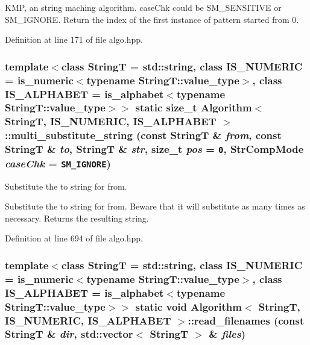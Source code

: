 KMP, an string maching algorithm. caseChk could be SM\_\-SENSITIVE or SM\_\-IGNORE. Return the index of the first instance of pattern started from 0. 

Definition at line 171 of file algo.hpp.\hypertarget{classAlgorithm_0a6aaf09e6d9d4214b5d6c86938006fb}{
\subsubsection[{multi\_\-substitute\_\-string}]{\setlength{\rightskip}{0pt plus 5cm}template$<$class StringT  = std::string, class IS\_\-NUMERIC  = is\_\-numeric$<$typename StringT::value\_\-type$>$, class IS\_\-ALPHABET  = is\_\-alphabet$<$typename StringT::value\_\-type$>$$>$ static size\_\-t {\bf Algorithm}$<$ StringT, IS\_\-NUMERIC, IS\_\-ALPHABET $>$::multi\_\-substitute\_\-string (const StringT \& {\em from}, \/  const StringT \& {\em to}, \/  StringT \& {\em str}, \/  size\_\-t {\em pos} = {\tt 0}, \/  StrCompMode {\em caseChk} = {\tt SM\_\-IGNORE})}}
\label{classAlgorithm_0a6aaf09e6d9d4214b5d6c86938006fb}


Substitute the to string for from. 

Substitute the to string for from. Beware that it will substitute as many times as necessary. Returns the resulting string. 

Definition at line 694 of file algo.hpp.\hypertarget{classAlgorithm_7f3d9af1b1567546161c773696660c5f}{
\subsubsection[{read\_\-filenames}]{\setlength{\rightskip}{0pt plus 5cm}template$<$class StringT  = std::string, class IS\_\-NUMERIC  = is\_\-numeric$<$typename StringT::value\_\-type$>$, class IS\_\-ALPHABET  = is\_\-alphabet$<$typename StringT::value\_\-type$>$$>$ static void {\bf Algorithm}$<$ StringT, IS\_\-NUMERIC, IS\_\-ALPHABET $>$::read\_\-filenames (const StringT \& {\em dir}, \/  std::vector$<$ StringT $>$ \& {\em files})}}
\label{classAlgorithm_7f3d9af1b1567546161c773696660c5f}


